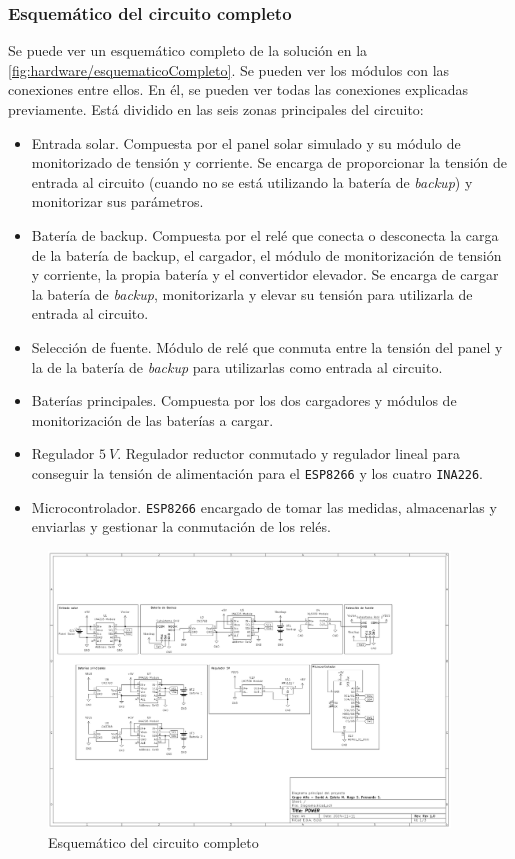 \subsubsection{Esquemático del circuito completo}

Se puede ver un esquemático completo de la solución en la \autoref{fig:hardware/esquematicoCompleto}. Se pueden ver los módulos con las conexiones entre ellos. En él, se pueden ver todas las conexiones explicadas previamente. Está dividido en las seis zonas principales del circuito:
\begin{itemize}
    \item Entrada solar. Compuesta por el panel solar simulado y su módulo de monitorizado de tensión y corriente. Se encarga de proporcionar la tensión de entrada al circuito (cuando no se está utilizando la batería de \textit{backup}) y monitorizar sus parámetros.
    \item Batería de backup. Compuesta por el relé que conecta o desconecta la carga de la batería de backup, el cargador, el módulo de monitorización de tensión y corriente, la propia batería y el convertidor elevador. Se encarga de cargar la batería de \textit{backup}, monitorizarla y elevar su tensión para utilizarla de entrada al circuito.
    \item Selección de fuente. Módulo de relé que conmuta entre la tensión del panel y la de la batería de \textit{backup} para utilizarlas como entrada al circuito.
    \item Baterías principales. Compuesta por los dos cargadores y módulos de monitorización de las baterías a cargar.
    \item Regulador $5\ V$. Regulador reductor conmutado y regulador lineal para conseguir la tensión de alimentación para el \texttt{ESP8266} y los cuatro \texttt{INA226}.
    \item Microcontrolador. \texttt{ESP8266} encargado de tomar las medidas, almacenarlas y enviarlas y gestionar la conmutación de los relés.
\end{itemize}

\begin{figure}[H]
    \centering
    \includegraphics[width=0.95\textwidth]{images/2-hardware/esquematicoCircuito.png}
    \caption{Esquemático del circuito completo}
    \label{fig:hardware/esquematicoCompleto}
\end{figure}

